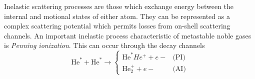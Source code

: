 	Inelastic scattering processes are those which exchange energy between the internal and motional states of either atom. They can be represented as a complex scattering potential \cite{leo01} which permits losses from on-shell scattering channels. An important inelastic process characteristic of metastable noble gases \cite{VassenReview} is \emph{Penning ionization}.  This can occur through the decay channels
	\begin{equation}
		\textrm{He}^*+\textrm{He}^*\rightarrow 
		\begin{cases}
			\textrm{He}^* He^+ + e-&\textrm{(PI)}\\
			\textrm{He}_{2}^{+} + e-&\textrm{(AI)}
		\end{cases}
	\end{equation}
